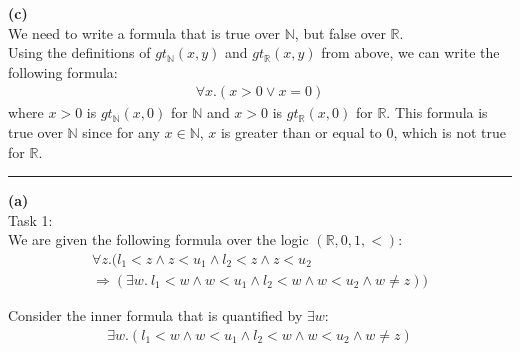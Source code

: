 \documentclass[12pt,letterpaper, onecolumn]{exam}
\begin{document}
\begin{questions}

	\textbf{(c)} \\
	We need to write a formula that is true over $\mathbb{N}$, but false over $\mathbb{R}$. \\
	Using the definitions of $ gt_{\mathbb{N}}(x, y) $ and $ gt_{\mathbb{R}}(x, y) $ from above,
	we can write the following formula:
	\begin{align*}
		\forall x. (x > 0 \lor x = 0)
	\end{align*}
	where $ x > 0 $ is $ gt_{\mathbb{N}}(x, 0) $ for $\mathbb{N}$ 
	and $ x > 0 $ is $ gt_{\mathbb{R}}(x, 0) $ for $\mathbb{R}$.
	This formula is true over $\mathbb{N}$ since for any $x \in \mathbb{N}$, $x$ is greater than or equal to $0$, which is not true for $\mathbb{R}$. \\

    {\rule{17cm}{0.4pt}}
	\question[]
	\solutiontitle
	\textbf{(a)} \\
	Task 1: \\
	We are given the following formula over the logic $ ( \mathbb{R}, 0, 1, < ) $: \\
	\begin{align*}
		\forall z. ( l_1 < z \land z < u_1 \land l_2 < z \land z < u_2 \\
		\Rightarrow ( \exists w. \: l_1 < w \land w < u_1 \land l_2 < w \land w < u_2 \land w \neq z ) )
	\end{align*}

	Consider the inner formula that is quantified by $ \exists w $:
	\begin{align*}
		\exists w. ( l_1 < w \land w < u_1 \land l_2 < w \land w < u_2 \land w \neq z )
	\end{align*}


\end{questions}
\end{document}
